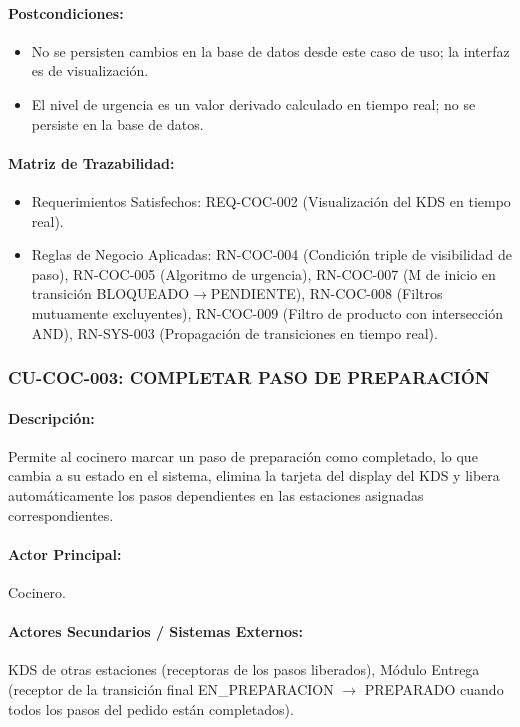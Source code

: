 \paragraph{Postcondiciones:}
\begin{itemize}
    \item No se persisten cambios en la base de datos desde este caso de uso; la interfaz es de visualización.
    \item El nivel de urgencia es un valor derivado calculado en tiempo real; no se persiste en la base de datos.
\end{itemize}

\paragraph{Matriz de Trazabilidad:}
\begin{itemize}
    \item Requerimientos Satisfechos: REQ-COC-002 (Visualización del KDS en tiempo real).
    \item Reglas de Negocio Aplicadas: RN-COC-004 (Condición triple de visibilidad de paso), RN-COC-005 (Algoritmo de urgencia), RN-COC-007 (M de inicio en transición BLOQUEADO$\rightarrow$PENDIENTE), RN-COC-008 (Filtros mutuamente excluyentes), RN-COC-009 (Filtro de producto con intersección AND), RN-SYS-003 (Propagación de transiciones en tiempo real).
\end{itemize}

\subsubsection{CU-COC-003: COMPLETAR PASO DE PREPARACIÓN}
\paragraph{Descripción:} Permite al cocinero marcar un paso de preparación como completado, lo que cambia a su estado en el sistema, elimina la tarjeta del display del KDS y libera automáticamente los pasos dependientes en las estaciones asignadas correspondientes.

\paragraph{Actor Principal:} Cocinero.

\paragraph{Actores Secundarios / Sistemas Externos:} KDS de otras estaciones (receptoras de los pasos liberados), Módulo Entrega (receptor de la transición final EN\_PREPARACION $\rightarrow$ PREPARADO cuando todos los pasos del pedido están completados).

